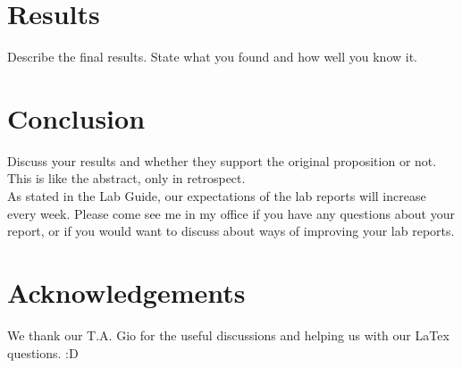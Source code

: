 \documentclass{article}[12pt]
\begin{document}
\section{Results}

Describe the final results. State what you found and how well you know it.

\section{Conclusion}
Discuss your results and whether they support the original proposition or not. This is like the abstract, only in retrospect.\\

As stated in the Lab Guide, our expectations of the lab reports will increase every week. Please come see me in my office if you have any questions about your report, or if you would want to discuss about ways of improving your lab reports.\\

\section{Acknowledgements}

We thank our T.A. Gio for the useful discussions and helping us with our LaTex questions. :D\\
\end{document}
